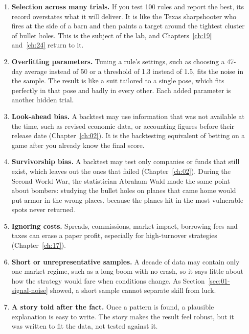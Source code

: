 \begin{enumerate}
  \item \textbf{Selection across many trials.} If you test 100 rules and report the best, its record overstates what it will deliver. It is like the Texas sharpshooter who fires at the side of a barn and then paints a target around the tightest cluster of bullet holes. This is the subject of the lab, and Chapters~\ref{ch:19} and~\ref{ch:24} return to it.
  \item \textbf{Overfitting parameters.} Tuning a rule's settings, such as choosing a 47-day average instead of 50 or a threshold of 1.3 instead of 1.5, fits the noise in the sample. The result is like a suit tailored to a single pose, which fits perfectly in that pose and badly in every other. Each added parameter is another hidden trial.
  \item \textbf{Look-ahead bias.} A backtest may use information that was not available at the time, such as revised economic data, or accounting figures before their release date (Chapter~\ref{ch:02}). It is the backtesting equivalent of betting on a game after you already know the final score.
  \item \textbf{Survivorship bias.} A backtest may test only companies or funds that still exist, which leaves out the ones that failed (Chapter~\ref{ch:02}). During the Second World War, the statistician Abraham Wald made the same point about bombers: studying the bullet holes on planes that came home would put armor in the wrong places, because the planes hit in the most vulnerable spots never returned.
  \item \textbf{Ignoring costs.} Spreads, commissions, market impact, borrowing fees and taxes can erase a paper profit, especially for high-turnover strategies (Chapter~\ref{ch:17}).
  \item \textbf{Short or unrepresentative samples.} A decade of data may contain only one market regime, such as a long boom with no crash, so it says little about how the strategy would fare when conditions change. As Section~\ref{sec:01-signal-noise} showed, a short sample cannot separate skill from luck.
  \item \textbf{A story told after the fact.} Once a pattern is found, a plausible explanation is easy to write. The story makes the result feel robust, but it was written to fit the data, not tested against it.
\end{enumerate}

